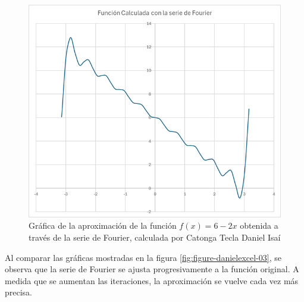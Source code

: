 {\begin{minipage}{\textwidth}
    \begin{figure}[H]
        \centering
        \includegraphics[width=0.9\linewidth,height=0.3\textheight]{Figures/fourierDaniel/Funcion Calculada.png}
        \caption[Gráfica de la aproximación de \( f(x) = 6 - 2x \) mediante la serie de Fourier]{Gráfica de la aproximación de la función \( f(x) = 6 - 2x \) obtenida a través de la serie de Fourier, calculada por Catonga Tecla Daniel Isaí}
        \label{fig:figure-danielexcel-02}
    \end{figure}
    

    Al comparar las gráficas mostradas en la figura \ref{fig:figure-danielexcel-03}, se observa que la serie de Fourier se ajusta progresivamente a la función original. A medida que se aumentan las iteraciones, la aproximación se vuelve cada vez más precisa.


\end{minipage}}
